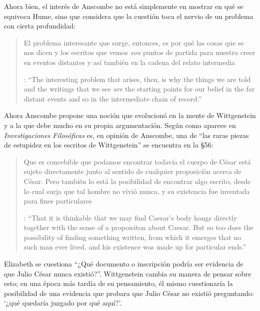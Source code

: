 Ahora bien, el interés de Anscombe no está simplemente en mostrar en qué se equivoca Hume, sino que considera que la cuestión toca el nervio de un problema con cierta profundidad: \blockquote[{\cite[122]{anscombe2011plato:humecaus}}: \enquote{The interesting problem that arises, then, is why the things we are told and the writings that we see \emph{are} the starting points for our belief in the far distant events and so in the intermediate chain of record.}]{El problema interesante que surge, entonces, es por qué las cosas que se nos dicen y los escritos que vemos \emph{son} puntos de partida para nuestro creer en eventos distantes y así también en la cadena del relato intermedia}.

Ahora Anscombe propone una noción que evolucionó en la mente de Wittgenstein y a la que debe mucho en su propia argumentación. Según como aparece en \emph{Investigaciones Filosóficas} es, en opinión de Anscombe, una de \enquote{las raras piezas de estupidez en los escritos de Wittgenstein} se encuentra en la \S56: \blockquote[{\cite[89]{anscombe1981parmenides:humeandjulius}}: \enquote{That it is thinkable that we may find Caesar's body hangs directly together with the sense of a propoisiton about Caesar. But so too does the possibility of finding something written, from which it emerges that no such man ever lived, and his existence was made up for particular ends.}]{Que es concebible que podamos encontrar todavía el cuerpo de César está sujeto directamente junto al sentido de cualquier proposición acerca de César. Pero también lo está la posibilidad de encontrar algo escrito, desde lo cual surja que tal hombre no vivió nunca, y su existencia fue inventada para fines particulares}. Elizabeth se cuestiona \enquote{¿Qué documento o inscripción podría ser evidencia de que Julio César nunca existió?}. Wittgenstein cambia su manera de pensar sobre esto; en una época más tardía de su pensamiento, él mismo cuestionaría la posibilidad de una evidencia que probara que Julio César no existió preguntando: \enquote*{¿qué quedaría juzgado por qué aquí?}.


